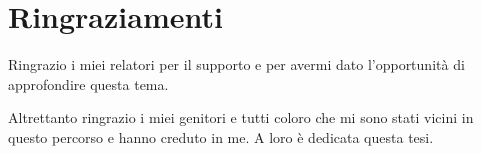 \chapter*{Ringraziamenti}
Ringrazio i miei relatori per il supporto e per avermi dato l'opportunità di approfondire questa tema.

Altrettanto ringrazio i miei genitori e tutti coloro che mi sono stati vicini in questo percorso e hanno creduto in me.
A loro è dedicata questa tesi.